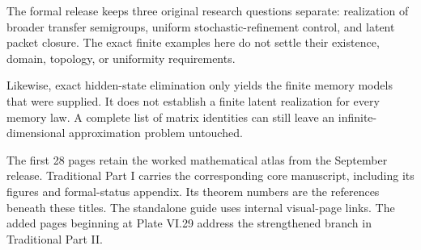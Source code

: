 The formal release keeps three original research questions separate: realization of broader transfer semigroups, uniform stochastic-refinement control, and latent packet closure. The exact finite examples here do not settle their existence, domain, topology, or uniformity requirements.

Likewise, exact hidden-state elimination only yields the finite memory models that were supplied. It does not establish a finite latent realization for every memory law. A complete list of matrix identities can still leave an infinite-dimensional approximation problem untouched.

The first 28 pages retain the worked mathematical atlas from the September release. Traditional Part I carries the corresponding core manuscript, including its figures and formal-status appendix. Its theorem numbers are the references beneath these titles. The standalone guide uses internal visual-page links. The added pages beginning at Plate VI.29 address the strengthened branch in Traditional Part II.


